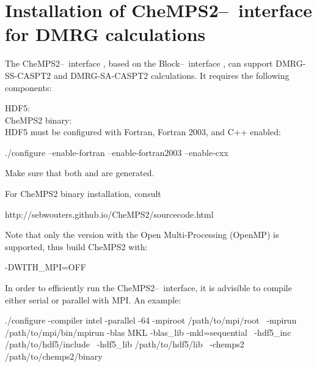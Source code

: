 
\section{Installation of CheMPS2--\molcas\ interface for DMRG calculations}
\label{sec:chemps2_installation}

The CheMPS2--\molcas\ interface \cite{Phung2016,Wouters2016},
based on the Block--\molcas\ interface \cite{Nakatani2017},
can support DMRG-SS-CASPT2 and DMRG-SA-CASPT2 calculations.
It requires the following components:

HDF5: \\
CheMPS2 binary: \\

HDF5 must be configured with Fortran, Fortran 2003, and C++ enabled:

\begin{sourcelisting}
./configure --enable-fortran --enable-fortran2003 --enable-cxx
\end{sourcelisting}

Make sure that both  and  are generated.

For CheMPS2 binary installation, consult  

\begin{sourcelisting}
http://sebwouters.github.io/CheMPS2/sourcecode.html
\end{sourcelisting}

Note that only the version with the Open Multi-Processing (OpenMP) is supported,
thus build CheMPS2 with:

\begin{sourcelisting}
-DWITH_MPI=OFF
\end{sourcelisting}

In order to efficiently run the CheMPS2--\molcas\ interface, 
it is advisible to compile either serial or parallel \molcas with MPI.
An example:

\begin{sourcelisting}
./configure -compiler intel -parallel -64 -mpiroot /path/to/mpi/root \
            -mpirun /path/to/mpi/bin/mpirun -blas MKL -blas_lib -mkl=sequential \
            -hdf5_inc /path/to/hdf5/include \
            -hdf5_lib /path/to/hdf5/lib \
            -chemps2 /path/to/chemps2/binary
\end{sourcelisting}

